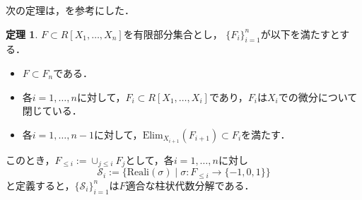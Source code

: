 \documentclass[uplatex, dvipdfmx]{jsarticle}
\numberwithin{equation}{section}
\newcommand{\calS}{\mathcal{S}}
\newcommand{\Elim}{\mathrm{Elim}}
\newcommand{\Reali}{\mathrm{Reali}}
\newcommand{\map}[3]{{#1}\colon{#2}\rightarrow{#3}}
\theoremstyle{definition}
\newtheorem{theorem}[definition]{定理}
\begin{document}
次の定理は，\cite[Theorem 5.34.]{MR2248869}を参考にした．
\begin{theorem}
     $F \subset R[X_1, \dots, X_n]$を有限部分集合とし，
     $\{F_i\}_{i=1}^n$が以下を満たすとする．
     \begin{itemize}
          \item $F \subset F_n$である．\\
          \item 各$i=1,\dots, n$に対して，$F_i \subset R[X_1, \dots, X_i]$であり，$F_i$は$X_i$での微分について閉じている．\\
          \item 各$i=1, \dots, n-1$に対して，$\Elim_{X_{i+1}}(F_{i+1}) \subset F_i$を満たす．
     \end{itemize}

     このとき，$F_{\leq i}:=\cup_{j \leq i} F_j$として，各$i=1, \dots, n$に対し
     \begin{equation}
          \calS_i := \{\Reali(\sigma) \mid \map{\sigma}{F_{\leq i}}{\{-1,0,1\}}\}
     \end{equation}          
     と定義すると，$\{\calS_i\}_{i=1}^n$は$F$適合な柱状代数分解である．
\end{theorem}
\end{document}
